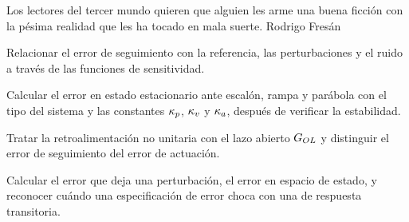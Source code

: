 
  {Los lectores del tercer mundo quieren que alguien les arme una buena ficción con la pésima realidad que les ha tocado en mala suerte.}
  {Rodrigo Fresán}

\begin{objetivos}
  \item Relacionar el error de seguimiento con la referencia, las perturbaciones y el ruido a través de las funciones de sensitividad.
  \item Calcular el error en estado estacionario ante escalón, rampa y parábola con el tipo del sistema y las constantes $\kappa_p$, $\kappa_v$ y $\kappa_a$, después de verificar la estabilidad.
  \item Tratar la retroalimentación no unitaria con el lazo abierto $G_{OL}$ y distinguir el error de seguimiento del error de actuación.
  \item Calcular el error que deja una perturbación, el error en espacio de estado, y reconocer cuándo una especificación de error choca con una de respuesta transitoria.
\end{objetivos}









